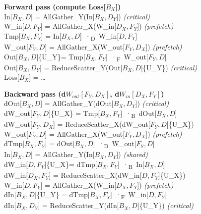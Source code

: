 \documentclass{article}
\begin{document}
\begin{tcolorbox}[
    title={Tensor Parallelism (Forward \& Backward)},
    colback=gray!6,
    colframe=black!70,
    boxrule=0.4pt,
    arc=2pt,
    left=4pt,right=4pt,top=4pt,bottom=4pt,
    label={fig:tensor_parallelism_algo},
    fontupper=\footnotesize\ttfamily,   %
    breakable
]

\textbf{Forward pass (compute Loss[$B_X$])}\\
In[$B_X,D$]         = AllGather\_Y(In[$B_X,D_Y$]) \textit{(critical)}\\
W\_in[$D,F_Y$]      = AllGather\_X(W\_in[$D_X,F_Y$]) \textit{(prefetch)}\\
Tmp[$B_X,F_Y$]      = In[$B_X,D$] ·\textsubscript{D} W\_in[$D,F_Y$]\\
W\_out[$F_Y,D$]     = AllGather\_X(W\_out[$F_Y,D_X$]) \textit{(prefetch)}\\
Out[$B_X,D$]\{U\_Y\}= Tmp[$B_X,F_Y$] ·\textsubscript{F} W\_out[$F_Y,D$]\\
Out[$B_X,D_Y$]      = ReduceScatter\_Y(Out[$B_X,D$]\{U\_Y\}) \textit{(critical)}\\
Loss[$B_X$]         = \dots\\

\vspace{0.4em}\tcbline\vspace{0.4em}  %

\textbf{Backward pass (d$W_{\!out}[F_Y,D_X]$, d$W_{\!in}[D_X,F_Y]$)}\\
dOut[$B_X,D$]         = AllGather\_Y(dOut[$B_X,D_Y$]) \textit{(critical)}\\
dW\_out[$F_Y,D$]\{U\_X\} = Tmp[$B_X,F_Y$] ·\textsubscript{B} dOut[$B_X,D$]\\
dW\_out[$F_Y,D_X$]    = ReduceScatter\_X(dW\_out[$F_Y,D$]\{U\_X\})\\
W\_out[$F_Y,D$]       = AllGather\_X(W\_out[$F_Y,D_X$]) \textit{(prefetch)}\\
dTmp[$B_X,F_Y$]       = dOut[$B_X,D$] ·\textsubscript{D} W\_out[$F_Y,D$]\\
In[$B_X,D$]           = AllGather\_Y(In[$B_X,D_Y$]) \textit{(shared)}\\
dW\_in[$D,F_Y$]\{U\_X\}= dTmp[$B_X,F_Y$] ·\textsubscript{B} In[$B_X,D$]\\
dW\_in[$D_X,F_Y$]     = ReduceScatter\_X(dW\_in[$D,F_Y$]\{U\_X\})\\
W\_in[$D,F_Y$]        = AllGather\_X(W\_in[$D_X,F_Y$]) \textit{(prefetch)}\\
dIn[$B_X,D$]\{U\_Y\}  = dTmp[$B_X,F_Y$] ·\textsubscript{F} W\_in[$D,F_Y$]\\
dIn[$B_X,D_Y$]        = ReduceScatter\_Y(dIn[$B_X,D$]\{U\_Y\}) \textit{(critical)}\\
\label{fig:tensor_parallelism_algo}
\end{tcolorbox}
\end{document}
